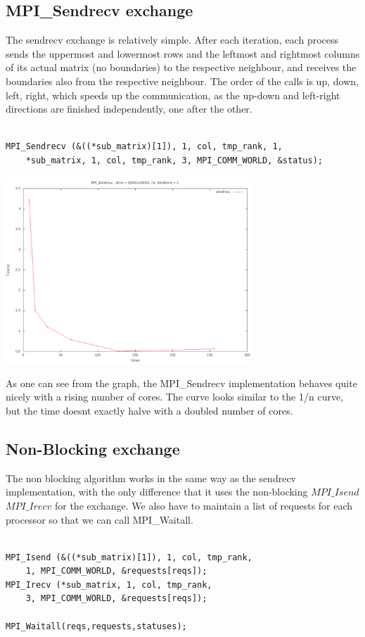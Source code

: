 \documentclass[11pt]{article}
\begin{document}
\subsection{MPI\_Sendrecv exchange}
The sendrecv exchange is relatively simple. After each iteration, each process sends the uppermost and lowermost rows and the leftmost and rightmost columns
of its actual matrix (no boundaries) to the respective neighbour, and receives the boundaries also from the respective neighbour. The order of the calls is
up, down, left, right, which speeds up the communication, as the up-down and left-right directions are finished independently, one after the other.\\
\begin{lstlisting}[label=some-code, caption=MPI\_Sendrecv left side call]

MPI_Sendrecv (&((*sub_matrix)[1]), 1, col, tmp_rank, 1,
    *sub_matrix, 1, col, tmp_rank, 3, MPI_COMM_WORLD, &status);

\end{lstlisting}
\begin{center}
\includegraphics[width=0.7\textwidth]{srcxt.png}
\end{center}

As one can see from the graph, the MPI\_Sendrecv implementation behaves quite nicely with a rising number of cores. The curve looks similar to
the 1/n curve, but the time doesnt exactly halve with a doubled number of cores.

\subsection{Non-Blocking exchange}
The non blocking algorithm works in the same way as the sendrecv implementation, with the only difference that it uses the non-blocking $MPI\_Isend$
$MPI\_Irecv$ for the exchange. We also have to maintain a list of requests for each processor so that we can call MPI\_Waitall.
\begin{lstlisting}[label=some-code, caption=Non-blocking MPI left call + MPI\_Waitall]
      
MPI_Isend (&((*sub_matrix)[1]), 1, col, tmp_rank, 
    1, MPI_COMM_WORLD, &requests[reqs]);
MPI_Irecv (*sub_matrix, 1, col, tmp_rank, 
    3, MPI_COMM_WORLD, &requests[reqs]);

MPI_Waitall(reqs,requests,statuses);

\end{lstlisting}
\end{document}
